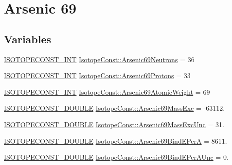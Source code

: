 \hypertarget{group___isotope_const-_arsenic-_as69}{}\section{Arsenic 69}
\label{group___isotope_const-_arsenic-_as69}
\subsection*{Variables}
\begin{DoxyCompactItemize}
\item 
\mbox{\hyperlink{group___isotope_const-_macros_ga5f18360b3e99483a35c32d789e62621c}{I\+S\+O\+T\+O\+P\+E\+C\+O\+N\+S\+T\+\_\+\+I\+NT}} \mbox{\hyperlink{group___isotope_const-_arsenic-_as69_ga8be53445712bdc7f6b1cbec2e27ede64}{Isotope\+Const\+::\+Arsenic69\+Neutrons}} = 36
\item 
\mbox{\hyperlink{group___isotope_const-_macros_ga5f18360b3e99483a35c32d789e62621c}{I\+S\+O\+T\+O\+P\+E\+C\+O\+N\+S\+T\+\_\+\+I\+NT}} \mbox{\hyperlink{group___isotope_const-_arsenic-_as69_ga61f88af4a247636101be67acc9fea228}{Isotope\+Const\+::\+Arsenic69\+Protons}} = 33
\item 
\mbox{\hyperlink{group___isotope_const-_macros_ga5f18360b3e99483a35c32d789e62621c}{I\+S\+O\+T\+O\+P\+E\+C\+O\+N\+S\+T\+\_\+\+I\+NT}} \mbox{\hyperlink{group___isotope_const-_arsenic-_as69_ga039e82ee99b80af1409ef2d7a324a291}{Isotope\+Const\+::\+Arsenic69\+Atomic\+Weight}} = 69
\item 
\mbox{\hyperlink{group___isotope_const-_macros_ga8f45a7272ce02c0b4c65c44636ed719a}{I\+S\+O\+T\+O\+P\+E\+C\+O\+N\+S\+T\+\_\+\+D\+O\+U\+B\+LE}} \mbox{\hyperlink{group___isotope_const-_arsenic-_as69_ga568694fd8a6bbd05f97948c69b3860bc}{Isotope\+Const\+::\+Arsenic69\+Mass\+Exc}} = -\/63112.
\item 
\mbox{\hyperlink{group___isotope_const-_macros_ga8f45a7272ce02c0b4c65c44636ed719a}{I\+S\+O\+T\+O\+P\+E\+C\+O\+N\+S\+T\+\_\+\+D\+O\+U\+B\+LE}} \mbox{\hyperlink{group___isotope_const-_arsenic-_as69_gaaea15ed71c36b4a4c63290e42cc34a7e}{Isotope\+Const\+::\+Arsenic69\+Mass\+Exc\+Unc}} = 31.
\item 
\mbox{\hyperlink{group___isotope_const-_macros_ga8f45a7272ce02c0b4c65c44636ed719a}{I\+S\+O\+T\+O\+P\+E\+C\+O\+N\+S\+T\+\_\+\+D\+O\+U\+B\+LE}} \mbox{\hyperlink{group___isotope_const-_arsenic-_as69_ga705487d00aaac1c0b3dea83c8e106e9f}{Isotope\+Const\+::\+Arsenic69\+Bind\+E\+PerA}} = 8611.
\item 
\mbox{\hyperlink{group___isotope_const-_macros_ga8f45a7272ce02c0b4c65c44636ed719a}{I\+S\+O\+T\+O\+P\+E\+C\+O\+N\+S\+T\+\_\+\+D\+O\+U\+B\+LE}} \mbox{\hyperlink{group___isotope_const-_arsenic-_as69_ga979c2ffe45fed32ecffe73aba1dfe3ba}{Isotope\+Const\+::\+Arsenic69\+Bind\+E\+Per\+A\+Unc}} = 0.

\end{DoxyCompactItemize}
